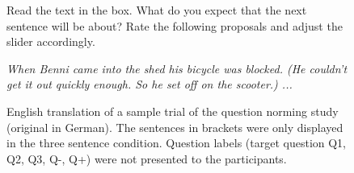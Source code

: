 \documentclass{salt}
\begin{document}
\begin{figure}[]
\caption{\small English translation of a sample trial of the question norming study (original in German). The sentences in brackets were only displayed in the three sentence condition. Question labels (target question Q1, Q2, Q3, Q-, Q+) were not presented to the participants.}
\footnotesize
Read the text in the box. What do you expect that the next sentence will be about? Rate the following proposals and adjust the slider accordingly.\vspace{1ex}

\begin{tcolorbox}
\textit{When Benni came into the shed his bicycle was blocked. (He couldn't get it out quickly enough. So he set off on the scooter.) ...}
\end{tcolorbox}


\end{figure}
\end{document}
